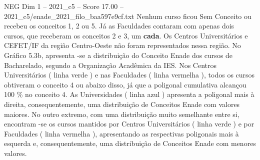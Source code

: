 \begin{textsample}{NEG Dim 1 – 2021\_c5 – Score 17.00 – 2021\_c5/enade\_2021\_filo\_baa597e9cf.txt}
Nenhum curso ficou Sem Conceito ou recebeu os conceitos 1, 2 ou 5.
Já as Faculdades contaram com apenas dois cursos, que receberam os conceitos 2 e 3, um \textbf{cada}.
Os Centros Universitários e CEFET/IF da região Centro-Oeste não foram representados nessa região.
No Gráfico 5.3b, apresenta -se a distribuição do Conceito Enade dos cursos de Bacharelado, segundo a Organização Acadêmica da IES.
Nos Centros Universitários ( linha verde ) e nas Faculdades ( linha vermelha ), todos os cursos obtiveram o conceito 4 ou abaixo disso, já que a poligonal cumulativa alcançou 100 \% no conceito 4.
As Universidades ( linha azul ) apresenta a poligonal mais à direita, consequentemente, uma distribuição de Conceitos Enade com valores maiores.
No outro extremo, com uma distribuição muito semelhante entre si, encontram -se os cursos mantidos por Centros Universitários ( linha verde ) e por Faculdades ( linha vermelha ), apresentando as respectivas poligonais mais à esquerda e, consequentemente, uma distribuição de Conceitos Enade com menores valores.

\end{textsample}
